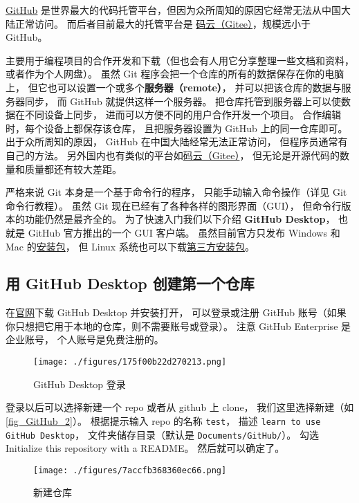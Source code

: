 \href{https://github.com/}{GitHub} 是世界最大的代码托管平台，但因为众所周知的原因它经常无法从中国大陆正常访问。 而后者目前最大的托管平台是 \href{https://gitee.com/}{码云（Gitee）}，规模远小于 GitHub。

主要用于编程项目的合作开发和下载（但也会有人用它分享整理一些文档和资料，或者作为个人网盘）。 虽然 Git 程序会把一个仓库的所有的数据保存在你的电脑上， 但它也可以设置一个或多个\textbf{服务器（remote）}， 并可以把该仓库的数据与服务器同步， 而 GitHub 就提供这样一个服务器。 把仓库托管到服务器上可以使数据在不同设备上同步， 进而可以方便不同的用户合作开发一个项目。 合作编辑时，每个设备上都保存该仓库， 且把服务器设置为 GitHub 上的同一仓库即可。 出于众所周知的原因， GitHub 在中国大陆经常无法正常访问， 但程序员通常有自己的方法。 另外国内也有类似的平台如\href{https://gitee.com/}{码云（Gitee）}， 但无论是开源代码的数量和质量都还有较大差距。

严格来说 Git 本身是一个基于命令行的程序， 只能手动输入命令操作（详见 Git 命令行教程）。 虽然 Git 现在已经有了各种各样的图形界面（GUI）， 但命令行版本的功能仍然是最齐全的。 为了快速入门我们以下介绍 \textbf{GitHub Desktop}， 也就是 GitHub 官方推出的一个 GUI 客户端。 虽然目前官方只发布 Windows 和 Mac 的\href{https://desktop.github.com/}{安装包}， 但 Linux 系统也可以下载\href{https://github.com/shiftkey/desktop/releases}{第三方安装包}。
 
\subsection{用 GitHub Desktop 创建第一个仓库}
在\href{https://desktop.github.com/}{官网}下载 GitHub Desktop 并安装打开， 可以登录或注册 GitHub 账号（如果你只想把它用于本地的仓库，则不需要账号或登录）。 注意 GitHub Enterprise 是企业账号， 个人账号是免费注册的。 %

\begin{figure}[ht]
\centering
\texttt{[image: ./figures/175f00b22d270213.png]}
\caption{GitHub Desktop 登录} \label{fig_GitHub_1}
\end{figure}

登录以后可以选择新建一个 repo 或者从 github 上 clone， 我们这里选择新建（如\autoref{fig_GitHub_2}）。 根据提示输入 repo 的名称 \verb|test|， 描述 \verb|learn to use GitHub Desktop|， 文件夹储存目录（默认是 \verb|Documents/GitHub/|）。 勾选 Initialize this repository with a README。 然后就可以确定了。

\begin{figure}[ht]
\centering
\texttt{[image: ./figures/7accfb368360ec66.png]}
\caption{新建仓库} \label{fig_GitHub_2}
\end{figure}


